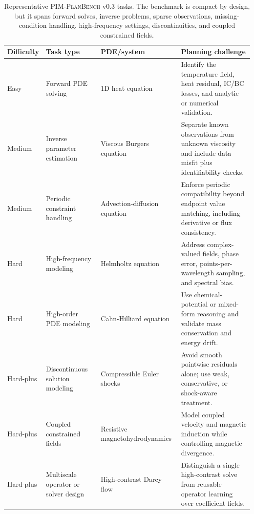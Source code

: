 \documentclass[11pt]{article}
\newcommand{\pimplanbench}{\textsc{PIM-PlanBench}}
\begin{document}
\begin{table}[t]
\caption{Representative \pimplanbench{} v0.3 tasks. The benchmark is compact by design, but it spans forward solves, inverse problems, sparse observations, missing-condition handling, high-frequency settings, discontinuities, and coupled constrained fields.}
\label{tab:task-examples}
\centering
\small
\begin{tabularx}{\textwidth}{p{}p{}p{}X}
\toprule
\textbf{Difficulty} & \textbf{Task type} & \textbf{PDE/system} & \textbf{Planning challenge} \\
\midrule
Easy & Forward PDE solving & 1D heat equation & Identify the temperature field, heat residual, IC/BC losses, and analytic or numerical validation. \\
Medium & Inverse parameter estimation & Viscous Burgers equation & Separate known observations from unknown viscosity and include data misfit plus identifiability checks. \\
Medium & Periodic constraint handling & Advection-diffusion equation & Enforce periodic compatibility beyond endpoint value matching, including derivative or flux consistency. \\
Hard & High-frequency modeling & Helmholtz equation & Address complex-valued fields, phase error, points-per-wavelength sampling, and spectral bias. \\
Hard & High-order PDE modeling & Cahn-Hilliard equation & Use chemical-potential or mixed-form reasoning and validate mass conservation and energy drift. \\
Hard-plus & Discontinuous solution modeling & Compressible Euler shocks & Avoid smooth pointwise residuals alone; use weak, conservative, or shock-aware treatment. \\
Hard-plus & Coupled constrained fields & Resistive magnetohydrodynamics & Model coupled velocity and magnetic induction while controlling magnetic divergence. \\
Hard-plus & Multiscale operator or solver design & High-contrast Darcy flow & Distinguish a single high-contrast solve from reusable operator learning over coefficient fields. \\
\bottomrule
\end{tabularx}
\end{table}
\end{document}
